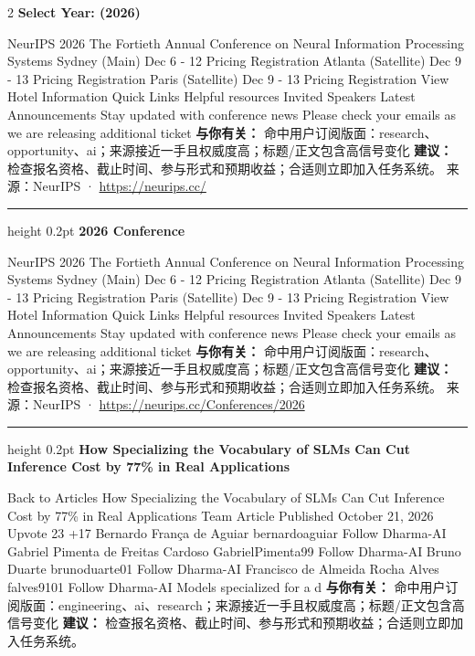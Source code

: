 \documentclass[10.5pt]{ctexart}
\begin{document}
\begin{multicols}{2}
{\large\bfseries Select Year: (2026)}\par
NeurIPS 2026 The Fortieth Annual Conference on Neural Information Processing Systems Sydney (Main) Dec 6 - 12 Pricing Registration Atlanta (Satellite) Dec 9 - 13 Pricing Registration Paris (Satellite) Dec 9 - 13 Pricing Registration View Hotel Information Quick Links Helpful resources Invited Speakers Latest Announcements Stay updated with conference news Please check your emails as we are releasing additional ticket
\textbf{与你有关：} 命中用户订阅版面：research、opportunity、ai；来源接近一手且权威度高；标题/正文包含高信号变化
\textbf{建议：} 检查报名资格、截止时间、参与形式和预期收益；合适则立即加入任务系统。
{\footnotesize\color{ormuted} 来源：NeurIPS · \url{https://neurips.cc/}}
\vspace{2mm}
\hrule height 0.2pt
\vspace{2mm}
{\large\bfseries 2026 Conference}\par
NeurIPS 2026 The Fortieth Annual Conference on Neural Information Processing Systems Sydney (Main) Dec 6 - 12 Pricing Registration Atlanta (Satellite) Dec 9 - 13 Pricing Registration Paris (Satellite) Dec 9 - 13 Pricing Registration View Hotel Information Quick Links Helpful resources Invited Speakers Latest Announcements Stay updated with conference news Please check your emails as we are releasing additional ticket
\textbf{与你有关：} 命中用户订阅版面：research、opportunity、ai；来源接近一手且权威度高；标题/正文包含高信号变化
\textbf{建议：} 检查报名资格、截止时间、参与形式和预期收益；合适则立即加入任务系统。
{\footnotesize\color{ormuted} 来源：NeurIPS · \url{https://neurips.cc/Conferences/2026}}
\vspace{2mm}
\hrule height 0.2pt
\vspace{2mm}
{\large\bfseries How Specializing the Vocabulary of SLMs Can Cut Inference Cost by 77\% in Real Applications}\par
Back to Articles How Specializing the Vocabulary of SLMs Can Cut Inference Cost by 77\% in Real Applications Team Article Published October 21, 2026 Upvote 23 +17 Bernardo França de Aguiar bernardoaguiar Follow Dharma-AI Gabriel Pimenta de Freitas Cardoso GabrielPimenta99 Follow Dharma-AI Bruno Duarte brunoduarte01 Follow Dharma-AI Francisco de Almeida Rocha Alves falves9101 Follow Dharma-AI Models specialized for a d
\textbf{与你有关：} 命中用户订阅版面：engineering、ai、research；来源接近一手且权威度高；标题/正文包含高信号变化
\textbf{建议：} 检查报名资格、截止时间、参与形式和预期收益；合适则立即加入任务系统。

\end{multicols}
\end{document}
